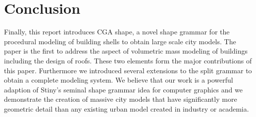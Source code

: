 \documentclass{article}
\begin{document}
\section{Conclusion}

Finally, this report introduces CGA shape, a novel shape grammar for the procedural modeling of building shells to obtain large scale city models. The paper is the first to address the aspect of volumetric mass modeling of buildings including the design of roofs. These two elements form the major contributions of this paper. Furthermore we introduced several extensions to the split grammar to obtain a complete modeling system. We believe that our work is a powerful adaption of Stiny’s seminal shape grammar idea for computer graphics and we demonstrate the creation of massive city models that have significantly more geometric detail than any existing urban model created in industry or academia.



\end{document}
